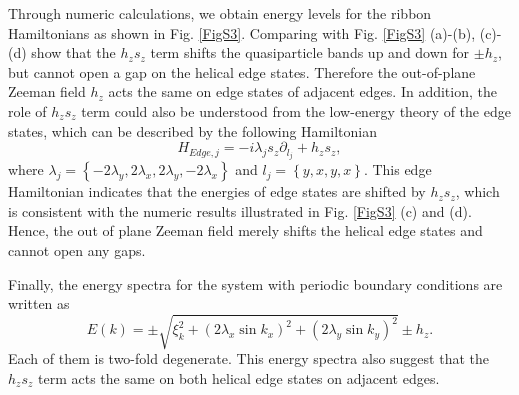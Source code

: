 \documentclass[twocolumn,prl,floatfix,citeautoscript,nofootinbib,superscriptaddress]{revtex4}
\begin{document}
Through numeric calculations, we obtain energy levels for the ribbon
Hamiltonians as shown in Fig. \ref{FigS3}. Comparing with Fig. \ref{FigS3}
(a)-(b), (c)-(d) show that the $h_{z}s_{z}$ term shifts the quasiparticle
bands up and down for $\pm h_{z}$, but cannot open a gap on the helical edge
states. Therefore the out-of-plane Zeeman field $h_{z}$ acts the same on
edge states of adjacent edges. In addition, the role of $h_{z}s_{z}$ term
could also be understood from the low-energy theory of the edge states,
which can be described by the following Hamiltonian%
\begin{equation}
H_{Edge,j}=-i\lambda _{j}s_{z}\partial _{l_{j}}+h_{z}s_{z},
\end{equation}%
where $\lambda _{j}=\left\{ -2\lambda _{y},2\lambda _{x},2\lambda
_{y},-2\lambda _{x}\right\} $ and $l_{j}=\left\{ y,x,y,x\right\} $. This
edge Hamiltonian indicates that the energies of edge states are shifted by $%
h_{z}s_{z}$, which is consistent with the numeric results illustrated in
Fig. \ref{FigS3} (c) and (d). Hence, the out of plane Zeeman field merely
shifts the helical edge states and cannot open any gaps.

Finally, the energy spectra for the system with periodic boundary conditions
are written as%
\begin{equation}
E\left( k\right) =\pm \sqrt{\xi _{k}^{2}+\left( 2\lambda _{x}\sin
k_{x}\right) ^{2}+\left( 2\lambda _{y}\sin k_{y}\right) ^{2}}\pm h_{z}.
\end{equation}%
Each of them is two-fold degenerate. This energy spectra also suggest that
the $h_{z}s_{z}$ term acts the same on both helical edge states on adjacent
edges.
\end{document}
